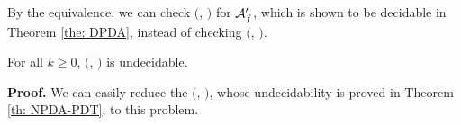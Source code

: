 By the equivalence, we can check \Real $($\DPDA, \PDT$)$ for ${\cal A}'_f$,
which is shown to be decidable in Theorem \ref{the: DPDA}, instead of checking \Real $($\DRPDAv, \RPDTk$)$.










\begin{theorem}
For all $k\geq 0$, \Real $($\NRPDA, \RPDTk$)$ is undecidable.
\end{theorem}
{\bf Proof.}\quad
We can easily reduce the \Real $($\NPDA, \PDT$)$,
whose undecidability is proved in Theorem \ref{th: NPDA-PDT}, to this problem.


